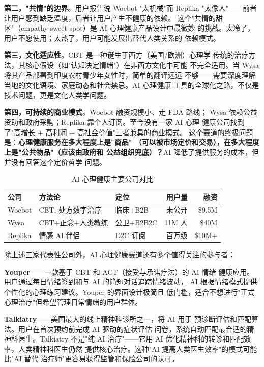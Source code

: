 \textbf{第二，"共情"的边界}。用户报告说 Woebot "太机械"而 Replika
"太像人"——前者让用户感到缺乏温度，后者让用户产生不健康的依赖。
这个"共情的甜区"（empathy sweet spot）是 AI 心理健康产品设计中最微妙
的挑战。太冷了，用户不愿使用；太热了，用户可能发展出替代人类关系的
依赖模式。

\textbf{第三，文化适应性}。CBT 是一种诞生于西方（美国/欧洲）心理学
传统的治疗方法，其核心假设（如"认知决定情绪"）在非西方文化中可能
不完全适用。当 Wysa 将其产品部署到印度农村青少年女性时，简单的翻译远远
不够——需要深度理解当地的文化语境、家庭动态和社会禁忌。AI 心理健康
工具的全球化之路，不仅是技术问题，更是文化人类学问题。

\textbf{第四，可持续的商业模式}。Woebot 融资规模小、走 FDA 路线；
Wysa 依赖公益资助和政府采购；Replika 靠个人订阅。至今没有一家 AI 心理
健康公司找到了"高增长 + 高利润 + 高社会价值"三者兼具的商业模式。
这个赛道的终极问题是：\textbf{心理健康服务在多大程度上是"商品"
（可以被市场定价和交易），在多大程度上是"公共物品"（应该由政府和
公益组织兜底）？}AI 降低了提供服务的成本，但并没有回答这个定价哲学
问题。

\begin{table}[htbp]
\centering
\caption{AI 心理健康主要公司对比}
\label{tab:mental-health-comparison}
\small
\begin{tabularx}{\textwidth}{l X l r r}
\toprule
\rowcolor{figLightGray}
\textbf{公司} & \textbf{方法论} & \textbf{定位} & \textbf{用户量} & \textbf{融资} \\
\midrule
Woebot   & CBT, 处方数字治疗    & 临床+B2B     & 未公开    & \$9.5M \\
Wysa     & CBT+正念+人类教练    & 公卫+B2B2C   & 11M 人    & \$40M  \\
Replika  & 情感 AI 伴侣         & D2C 订阅     & 百万级    & \$10M+ \\
\bottomrule
\end{tabularx}
\end{table}

除上述三家代表性公司外，AI 心理健康赛道还有多个值得关注的参与者：

\textbf{Youper}——一款基于 CBT 和 ACT（接受与承诺疗法）的 AI 情绪
健康应用。用户通过每日情绪签到和与 AI 的简短对话追踪情绪波动，
AI 根据情绪模式提供个性化的心理练习建议。Youper 的界面设计极简且
低门槛，适合不想进行"正式心理治疗"但希望管理日常情绪的用户群体。

\textbf{Talkiatry}——美国最大的线上精神科诊所之一，将 AI 用于
预诊断评估和匹配算法。用户在首次预约前完成 AI 驱动的症状评估
问卷，系统自动匹配最合适的精神科医生。Talkiatry 不是"纯 AI
治疗"——它用 AI 优化精神科的转诊和匹配效率，人类精神科医生仍然
提供核心治疗。这种"AI 提高人类医生效率"的模式可能比"AI 替代
治疗师"更容易获得监管和保险公司的认可。

